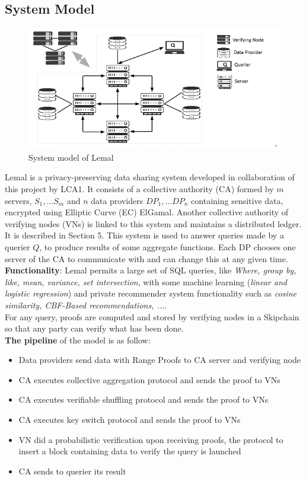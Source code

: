 \documentclass{article}
\begin{document}
\subsection{System Model}
\begin{figure}[H]
\center
\includegraphics[scale=0.75]{img/lemal.png}
\caption{System model of Lemal}
\end{figure}
Lemal is a privacy-preserving data sharing system developed in collaboration of this project by LCA1. It consists of a collective authority (CA) formed by $m$ servers, $S_1,...S_m$ and $n$ data providers $DP_1,...DP_n$ containing sensitive data, encrypted using Elliptic Curve (EC) ElGamal.
Another collective authority of verifying nodes (VNs) is linked to this system and maintains a distributed ledger. It is described in Section 5. This system is used to answer queries made by a querier $Q$, to produce results of some aggregate functions. Each DP chooses one server of the CA to communicate with and can change this at any given time.\\
\textbf{Functionality}: Lemal permits a large set of SQL queries, like \textit{Where, group by, like, mean, variance, set intersection}, with some machine learning (\textit{linear and logistic regression}) and private recommender system functionality such as \textit{cosine similarity, CBF-Based recommendations, ...}.\\
For any query, proofs are computed and stored by verifying nodes in a Skipchain so that any party can verify what has been done.\\
\textbf{The pipeline} of the model is as follow:
\begin{itemize}
\item{Data providers send data with Range Proofs to CA server and verifying node}
\item{CA executes collective aggregation protocol and sends the proof to VNs}
\item{CA executes verifiable shuffling protocol and sends the proof to VNs}
\item{CA executes key switch protocol and sends the proof to VNs}
\item{VN did a probabilistic verification upon receiving proofs, the protocol to insert a block containing data to verify the query is launched}
\item{CA sends to querier its result}
\end{itemize}
\end{document}
